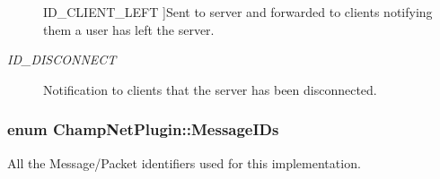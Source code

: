\begin{Desc}
\begin{description}
{\hypertarget{namespace_champ_net_plugin_a2ade5cfa7cf6c25ab7236c6b54a57821a170a6a655b34086567c4039a8e9ba81d}{I\-D\-\_\-\-C\-L\-I\-E\-N\-T\-\_\-\-L\-E\-F\-T}\label{namespace_champ_net_plugin_a2ade5cfa7cf6c25ab7236c6b54a57821a170a6a655b34086567c4039a8e9ba81d}
}]Sent to server and forwarded to clients notifying them a user has left the server. \item[{\em 
\hypertarget{namespace_champ_net_plugin_a2ade5cfa7cf6c25ab7236c6b54a57821ab64ca706dd3c8029ea9dc9a239237e15}{I\-D\-\_\-\-D\-I\-S\-C\-O\-N\-N\-E\-C\-T}\label{namespace_champ_net_plugin_a2ade5cfa7cf6c25ab7236c6b54a57821ab64ca706dd3c8029ea9dc9a239237e15}
}]Notification to clients that the server has been disconnected. \end{description}
\end{Desc}
\hypertarget{namespace_champ_net_plugin_a2ade5cfa7cf6c25ab7236c6b54a57821}{
\subsubsection[{Message\-I\-Ds}]{\setlength{\rightskip}{0pt plus 5cm}enum {\bf Champ\-Net\-Plugin\-::\-Message\-I\-Ds}}}\label{namespace_champ_net_plugin_a2ade5cfa7cf6c25ab7236c6b54a57821}


All the Message/\-Packet identifiers used for this implementation. 

